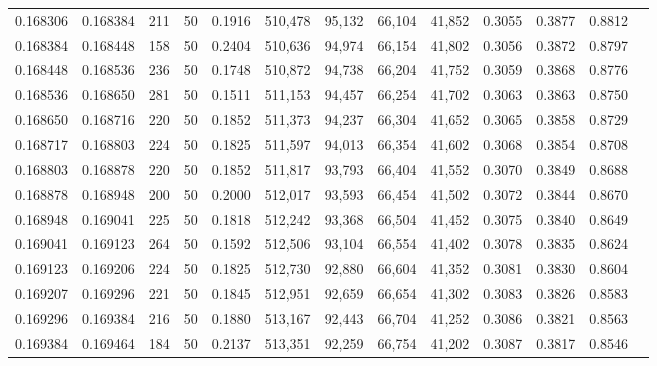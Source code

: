 \begin{tabular}{rrrrrrrrrrrrr}
0.168306 & 0.168384 &   211 &  50 &                                     0.1916 & 510,478 &  95,132 &  66,104 &  41,852 & 0.3055 & 0.3877 & 0.8812 \\
0.168384 & 0.168448 &   158 &  50 &                                     0.2404 & 510,636 &  94,974 &  66,154 &  41,802 & 0.3056 & 0.3872 & 0.8797 \\
0.168448 & 0.168536 &   236 &  50 &                                     0.1748 & 510,872 &  94,738 &  66,204 &  41,752 & 0.3059 & 0.3868 & 0.8776 \\
0.168536 & 0.168650 &   281 &  50 &                                     0.1511 & 511,153 &  94,457 &  66,254 &  41,702 & 0.3063 & 0.3863 & 0.8750 \\
0.168650 & 0.168716 &   220 &  50 &                                     0.1852 & 511,373 &  94,237 &  66,304 &  41,652 & 0.3065 & 0.3858 & 0.8729 \\
0.168717 & 0.168803 &   224 &  50 &                                     0.1825 & 511,597 &  94,013 &  66,354 &  41,602 & 0.3068 & 0.3854 & 0.8708 \\
0.168803 & 0.168878 &   220 &  50 &                                     0.1852 & 511,817 &  93,793 &  66,404 &  41,552 & 0.3070 & 0.3849 & 0.8688 \\
0.168878 & 0.168948 &   200 &  50 &                                     0.2000 & 512,017 &  93,593 &  66,454 &  41,502 & 0.3072 & 0.3844 & 0.8670 \\
0.168948 & 0.169041 &   225 &  50 &                                     0.1818 & 512,242 &  93,368 &  66,504 &  41,452 & 0.3075 & 0.3840 & 0.8649 \\
0.169041 & 0.169123 &   264 &  50 &                                     0.1592 & 512,506 &  93,104 &  66,554 &  41,402 & 0.3078 & 0.3835 & 0.8624 \\
0.169123 & 0.169206 &   224 &  50 &                                     0.1825 & 512,730 &  92,880 &  66,604 &  41,352 & 0.3081 & 0.3830 & 0.8604 \\
0.169207 & 0.169296 &   221 &  50 &                                     0.1845 & 512,951 &  92,659 &  66,654 &  41,302 & 0.3083 & 0.3826 & 0.8583 \\
0.169296 & 0.169384 &   216 &  50 &                                     0.1880 & 513,167 &  92,443 &  66,704 &  41,252 & 0.3086 & 0.3821 & 0.8563 \\
0.169384 & 0.169464 &   184 &  50 &                                     0.2137 & 513,351 &  92,259 &  66,754 &  41,202 & 0.3087 & 0.3817 & 0.8546 \\

\end{tabular}
